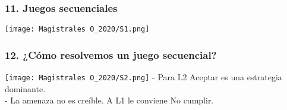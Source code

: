 \documentclass[14pt]{beamer}
\begin{document}
\begin{frame}
\frametitle{11. Juegos secuenciales}
\texttt{[image: Magistrales O\_2020/S1.png]}
\end{frame}

\begin{frame}
\frametitle{12. ¿Cómo resolvemos un juego secuencial?}
\texttt{[image: Magistrales O\_2020/S2.png]}
 - Para L2 Aceptar es una estrategia dominante. \\
  - La amenaza no es creíble. A L1 le conviene No cumplir.\\
 \end{frame}
\end{document}
